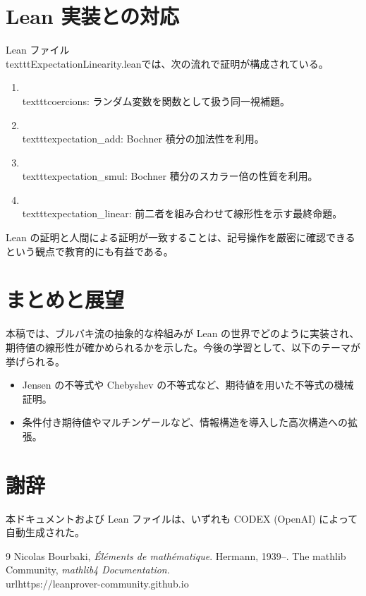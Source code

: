 \documentclass[12pt]{ltjsarticle}
\theoremstyle{definition}
\theoremstyle{plain}
\begin{document}
\section{Lean 実装との対応}
Lean ファイル\\texttt{ExpectationLinearity.lean}では、次の流れで証明が構成されている。
\begin{enumerate}[label=\textup{(\arabic*)}]
  \item \\texttt{coercions}: ランダム変数を関数として扱う同一視補題。
  \item \\texttt{expectation\_add}: Bochner 積分の加法性を利用。
  \item \\texttt{expectation\_smul}: Bochner 積分のスカラー倍の性質を利用。
  \item \\texttt{expectation\_linear}: 前二者を組み合わせて線形性を示す最終命題。
\end{enumerate}

Lean の証明と人間による証明が一致することは、記号操作を厳密に確認できるという観点で教育的にも有益である。

\section{まとめと展望}
本稿では、ブルバキ流の抽象的な枠組みが Lean の世界でどのように実装され、期待値の線形性が確かめられるかを示した。今後の学習として、以下のテーマが挙げられる。
\begin{itemize}
  \item Jensen の不等式や Chebyshev の不等式など、期待値を用いた不等式の機械証明。
  \item 条件付き期待値やマルチンゲールなど、情報構造を導入した高次構造への拡張。
\end{itemize}

\section*{謝辞}
本ドキュメントおよび Lean ファイルは、いずれも CODEX (OpenAI) によって自動生成された。

\begin{thebibliography}{9}
 Nicolas Bourbaki, \emph{Éléments de mathématique}. Hermann, 1939--.
 The mathlib Community, \emph{mathlib4 Documentation}. \\url{https://leanprover-community.github.io}
\end{thebibliography}
\end{document}
